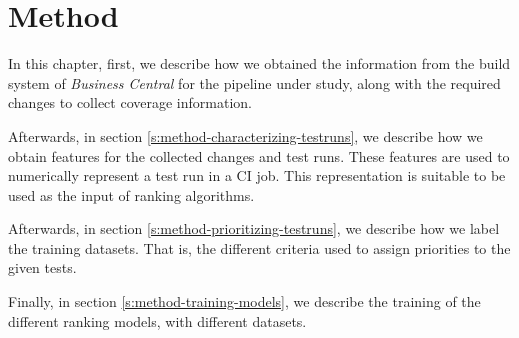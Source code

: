 \chapter{Method}\label{s:method}

In this chapter, first, we describe how we obtained the information
from the build system of \emph{Business Central} for the pipeline under study, 
along with the required changes to collect coverage information.

Afterwards, in section \ref{s:method-characterizing-testruns}, we describe how we obtain features for
the collected changes and test runs. These features are used to numerically represent a 
test run in a CI job. This representation is suitable to be used as the input of ranking algorithms.

Afterwards, in section \ref{s:method-prioritizing-testruns}, we describe how we label
the training datasets. That is, the different criteria used to assign priorities to
the given tests.

Finally, in section \ref{s:method-training-models}, we describe the training of the 
different ranking models, with different datasets.




